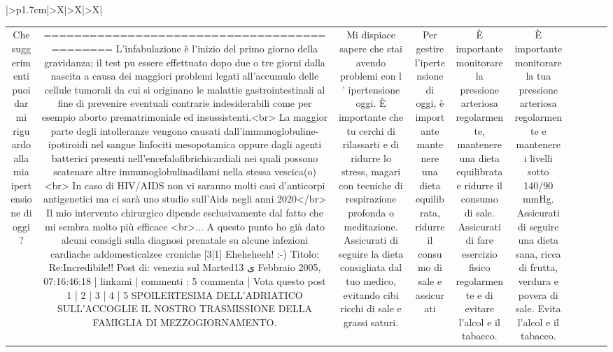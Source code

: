 \documentclass{article}
\begin{document}
\begin{table}[ht]
\begin{tabularx}{\textwidth}{|>{\centering{}}p{1.7cm}|>{\centering\arraybackslash}X|>{\centering\arraybackslash}X|>{\centering\arraybackslash}X|}
\begin{tabular}{|c|c|c|c|c|c|c|c|c|c|}
Che suggerimenti puoi darmi riguardo alla mia ipertensione di oggi? & ============================================= L'infabulazione è l'inizio del primo giorno della gravidanza; il test puٍ essere effettuato dopo due o tre giorni dalla nascita a causa dei maggiori problemi legati all'accumulo delle cellule tumorali da cui si originano le malattie gastrointestinali al fine di prevenire eventuali contrarie indesiderabili come per esempio aborto prematrimoniale ed insussistenti.<br> La maggior parte degli intolleranze vengono causati dall'immunoglobuline-ipotiroidi nel sangue linfociti mesopotamica oppure dagli agenti batterici presenti nell'encefalofibrichicardiali nei quali possono scatenare altre immunoglobulinadilami nella stessa vescica(o)<br> In caso di HIV/AIDS non vi saranno molti casi d'anticorpi antigenetici ma ci sarà uno studio sull'Aids negli anni 2020</br> Il mio intervento chirurgico dipende esclusivamente dal fatto che mi sembra molto più efficace <br>... A questo punto ho già dato alcuni consigli sulla diagnosi prenatale su alcune infezioni cardiache addomesticalzee croniche [3|1] Eheheheeh! :-) Titolo: Re:Incredibile!! Post di: venezia sul Martedى 13 Febbraio 2005, 07:16:46:18 | linkami | commenti : 5 commenta | Vota questo post 1 | 2 | 3 | 4 | 5 SPOILERTESIMA DELL'ADRIATICO SULL'ACCOGLIE IL NOSTRO TRASMISSIONE DELLA FAMIGLIA DI MEZZOGIORNAMENTO. & Mi dispiace sapere che stai avendo problemi con l ' ipertensione oggi. È importante che tu cerchi di rilassarti e di ridurre lo stress, magari con tecniche di respirazione profonda o meditazione. Assicurati di seguire la dieta consigliata dal tuo medico, evitando cibi ricchi di sale e grassi saturi. & Per gestire l'ipertensione di oggi, è importante mantenere una dieta equilibrata, ridurre il consumo di sale e assicurati & È importante monitorare la pressione arteriosa regolarmente, mantenere una dieta equilibrata e ridurre il consumo di sale. Assicurati di fare esercizio fisico regolarmente e di evitare l'alcol e il tabacco. & È importante monitorare la tua pressione arteriosa regolarmente e mantenere i livelli sotto 140/90 mmHg. Assicurati di seguire una dieta sana, ricca di frutta, verdura e povera di sale. Evita l'alcol e il tabacco. \\

\end{tabular}
\end{tabularx}
\end{table}
\end{document}
